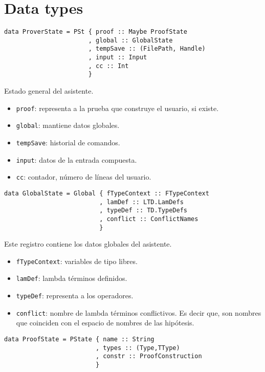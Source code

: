 \documentclass[a4paper,11pt]{article}
\begin{document}
\section{Data types}

\begin{verbatim}
data ProverState = PSt { proof :: Maybe ProofState
                       , global :: GlobalState
                       , tempSave :: (FilePath, Handle)
                       , input :: Input
                       , cc :: Int
                       }
\end{verbatim}

Estado general del asistente.
\begin{itemize}
  \item \texttt{proof}: representa a la prueba que construye el usuario, si existe.
  \item \texttt{global}: mantiene datos globales.
  \item \texttt{tempSave}: historial de comandos.
  \item \texttt{input}: datos de la entrada compuesta.
  \item \texttt{cc}: contador, número de líneas del usuario. 
\end{itemize}

\begin{verbatim}
data GlobalState = Global { fTypeContext :: FTypeContext
                          , lamDef :: LTD.LamDefs
                          , typeDef :: TD.TypeDefs
                          , conflict :: ConflictNames
                          }
\end{verbatim}

Este registro contiene los datos globales del asistente.
\begin{itemize}
  \item \texttt{fTypeContext}: variables de tipo libres.
  \item \texttt{lamDef}: lambda términos definidos.
  \item \texttt{typeDef}: representa a los operadores.
  \item \texttt{conflict}: nombre de lambda términos conflictivos. Es decir que, son nombres
    que coinciden con el espacio de nombres de las hipótesis.
\end{itemize}

\begin{verbatim}
data ProofState = PState { name :: String
                         , types :: (Type,TType)
                         , constr :: ProofConstruction
                         }
\end{verbatim}
\end{document}
